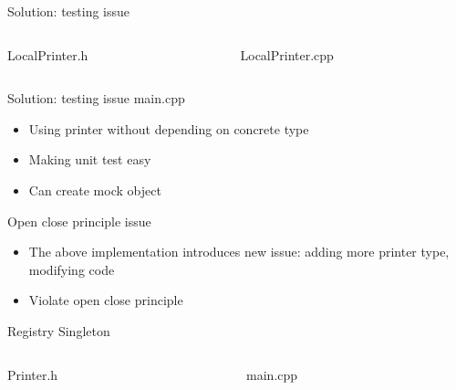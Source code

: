 \documentclass[13pt]{beamer}
\begin{document}
\begin{frame}{Solution: testing issue}
\begin{columns}[T]
	\begin{column}{.45\textwidth}
		LocalPrinter.h
		\lstset{basicstyle=\tiny,style=myCustomCppStyle}
		
	\end{column}
	
	\begin{column}{.45\textwidth}
		LocalPrinter.cpp
		\lstset{basicstyle=\tiny,style=myCustomCppStyle}
		
	\end{column}
\end{columns}
\end{frame}

\begin{frame}{Solution: testing issue}
	main.cpp
	\lstset{basicstyle=\tiny,style=myCustomCppStyle}
	
	\begin{itemize}
		\setlength\itemsep{1em}
		\item Using printer without depending on concrete type
		\item Making unit test easy
		\item Can create mock object
	\end{itemize}
\end{frame}

\begin{frame}{Open close principle issue}
	\begin{itemize}
		\setlength\itemsep{1em}
		\item The above implementation introduces new issue: adding more printer type, modifying code
		\item Violate open close principle
	\end{itemize}
\end{frame}

\begin{frame}{Registry Singleton}
\begin{columns}[T]
	\begin{column}{.45\textwidth}
		Printer.h
		\lstset{basicstyle=\tiny,style=myCustomCppStyle}
		
	\end{column}
	
	\begin{column}{.45\textwidth}
		main.cpp
		\lstset{basicstyle=\tiny,style=myCustomCppStyle}
		
	\end{column}
\end{columns}
\end{frame}
\end{document}
